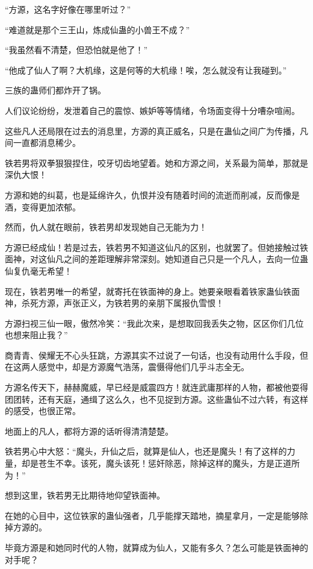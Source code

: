 
\begin{this_body}

“方源，这名字好像在哪里听过？”

“难道就是那个三王山，炼成仙蛊的小兽王不成？”

“我虽然看不清楚，但恐怕就是他了！”

“他成了仙人了啊？大机缘，这是何等的大机缘！唉，怎么就没有让我碰到。”

三族的蛊师们都炸开了锅。

人们议论纷纷，发泄着自己的震惊、嫉妒等等情绪，令场面变得十分嘈杂喧闹。

这些凡人还局限在过去的消息里，方源的真正威名，只是在蛊仙之间广为传播，凡间一直都消息稀少。

铁若男将双拳狠狠捏住，咬牙切齿地望着。她和方源之间，关系最为简单，那就是深仇大恨！

方源和她的纠葛，也是延绵许久，仇恨并没有随着时间的流逝而削减，反而像是酒，变得更加浓郁。

然而，仇人就在眼前，铁若男却发现她自己无能为力！

方源已经成仙！若是过去，铁若男不知道这仙凡的区别，也就罢了。但她接触过铁面神，对这仙凡之间的差距理解非常深刻。她知道自己只是一个凡人，去向一位蛊仙复仇毫无希望！

现在，铁若男唯一的希望，就寄托在铁面神的身上。她要亲眼看着铁家蛊仙铁面神，杀死方源，声张正义，为铁若男的亲朋下属报仇雪恨！

方源扫视三仙一眼，傲然冷笑：“我此次来，是想取回我丢失之物，区区你们几位也想来阻止我？”

商青青、侯耀无不心头狂跳，方源其实不过说了一句话，也没有动用什么手段，但在这两人感觉中，却是方源魔气浩荡，震慑得他们几乎斗志全无。

方源名传天下，赫赫魔威，早已经是威震四方！就连武庸那样的人物，都被他耍得团团转，还有天庭，通缉了这么久，也不见捉到方源。这些蛊仙不过六转，有这样的感受，也很正常。

地面上的凡人，都将方源的话听得清清楚楚。

铁若男心中大怒：“魔头，升仙之后，就算是仙人，也还是魔头！有了这样的力量，却是苍生不幸。该死，魔头该死！惩奸除恶，除掉这样的魔头，方是正道所为！”

想到这里，铁若男无比期待地仰望铁面神。

在她的心目中，这位铁家的蛊仙强者，几乎能撑天踏地，摘星拿月，一定是能够除掉方源的。

毕竟方源是和她同时代的人物，就算成为仙人，又能有多久？怎么可能是铁面神的对手呢？


\end{this_body}
